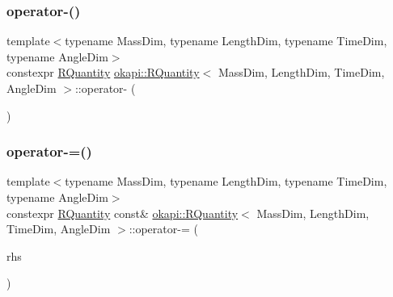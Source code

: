 \mbox{\label{classokapi_1_1RQuantity_a245f7d6d3400a4776604315baa0a3d88}} 
\subsubsection{\texorpdfstring{operator-\/()}{operator-()}}
{\footnotesize\ttfamily template$<$typename Mass\+Dim, typename Length\+Dim, typename Time\+Dim, typename Angle\+Dim$>$ \\
constexpr \mbox{\hyperlink{classokapi_1_1RQuantity}{R\+Quantity}} \mbox{\hyperlink{classokapi_1_1RQuantity}{okapi\+::\+R\+Quantity}}$<$ Mass\+Dim, Length\+Dim, Time\+Dim, Angle\+Dim $>$\+::operator-\/ (\begin{DoxyParamCaption}{ }\end{DoxyParamCaption})\hspace{0.3cm}{\ttfamily [inline]}}

\mbox{\label{classokapi_1_1RQuantity_a1b0ae4c9b6c2b6cd47904874ea3ea01c}} 
\subsubsection{\texorpdfstring{operator-\/=()}{operator-=()}}
{\footnotesize\ttfamily template$<$typename Mass\+Dim, typename Length\+Dim, typename Time\+Dim, typename Angle\+Dim$>$ \\
constexpr \mbox{\hyperlink{classokapi_1_1RQuantity}{R\+Quantity}} const\& \mbox{\hyperlink{classokapi_1_1RQuantity}{okapi\+::\+R\+Quantity}}$<$ Mass\+Dim, Length\+Dim, Time\+Dim, Angle\+Dim $>$\+::operator-\/= (\begin{DoxyParamCaption}\item[{const \mbox{\hyperlink{classokapi_1_1RQuantity}{R\+Quantity}}$<$ Mass\+Dim, Length\+Dim, Time\+Dim, Angle\+Dim $>$ \&}]{rhs }\end{DoxyParamCaption})\hspace{0.3cm}{\ttfamily [inline]}}

